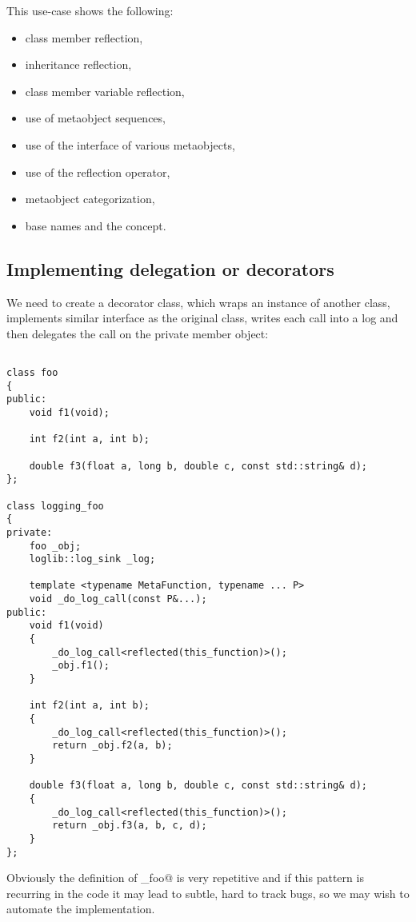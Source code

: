 This use-case shows the following:

\begin{itemize}
\item{class member reflection,}
\item{inheritance reflection,}
\item{class member variable reflection,}
\item{use of metaobject sequences,}
\item{use of the interface of various metaobjects,}
\item{use of the reflection operator,}
\item{metaobject categorization,}
\item{base names and the  concept.}
\end{itemize}


\subsection{Implementing delegation or decorators}

We need to create a decorator class, which wraps an instance of another
class, implements similar interface as the original class, writes each call into
a log and then delegates the call on the private member object:

\begin{verbatim}

class foo
{
public:
	void f1(void);

	int f2(int a, int b);

	double f3(float a, long b, double c, const std::string& d);
};

class logging_foo
{
private:
	foo _obj;
	loglib::log_sink _log;

	template <typename MetaFunction, typename ... P>
	void _do_log_call(const P&...);
public:
	void f1(void)
	{
		_do_log_call<reflected(this_function)>();
		_obj.f1();
	}

	int f2(int a, int b);
	{
		_do_log_call<reflected(this_function)>();
		return _obj.f2(a, b);
	}

	double f3(float a, long b, double c, const std::string& d);
	{
		_do_log_call<reflected(this_function)>();
		return _obj.f3(a, b, c, d);
	}
};

\end{verbatim}

Obviously the definition of \verb@logging_foo@ is very repetitive and if this
pattern is recurring in the code it may lead to subtle, hard to track bugs,
so we may wish to automate the implementation.

